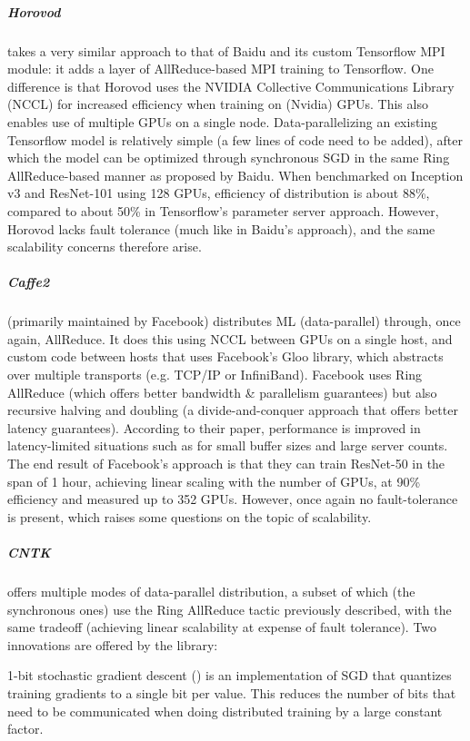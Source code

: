 \subparagraph{Horovod\citep{Horovod2018}}

takes a very similar approach to that of Baidu and its custom Tensorflow MPI module: it adds a layer of AllReduce-based MPI training to Tensorflow. One difference is that Horovod uses the NVIDIA Collective Communications Library (NCCL) for increased efficiency when training on (Nvidia) GPUs. This also enables use of multiple GPUs on a single node. Data-parallelizing an existing Tensorflow model is relatively simple (a few lines of code need to be added), after which the model can be optimized through synchronous SGD in the same Ring AllReduce-based manner as proposed by Baidu. When benchmarked on Inception v3\citep{Szegedy2015} and ResNet-101\citep{He2015} using 128 GPUs, efficiency of distribution is about 88\%, compared to about 50\% in Tensorflow's parameter server approach.
However, Horovod lacks fault tolerance (much like in Baidu's approach), and the same scalability concerns therefore arise.

\subparagraph{Caffe2}

(primarily maintained by Facebook) distributes ML (data-parallel) through, once again, AllReduce. It does this using NCCL between GPUs on a single host, and custom code between hosts that uses Facebook's Gloo library, which abstracts over multiple transports (e.g. TCP/IP or InfiniBand). Facebook uses Ring AllReduce (which offers better bandwidth \& parallelism guarantees) but also recursive halving and doubling (a divide-and-conquer approach that offers better latency guarantees). According to their paper, performance is improved in latency-limited situations such as for small buffer sizes and large server counts. The end result of Facebook’s approach is that they can train ResNet-50\citep{He2015} in the span of 1 hour\citep{Goyal2017}, achieving linear scaling with the number of GPUs, at 90\% efficiency and measured up to 352 GPUs. However, once again no fault-tolerance is present, which raises some questions on the topic of scalability.

\subparagraph{CNTK}

offers multiple modes of data-parallel distribution, a subset of which (the synchronous ones) use the Ring AllReduce tactic previously described, with the same tradeoff (achieving linear scalability at expense of fault tolerance). Two innovations are offered by the library:

1-bit stochastic gradient descent (\citet{Seide2014}) is an implementation of SGD that quantizes training gradients to a single bit per value. This reduces the number of bits that need to be communicated when doing distributed training by a large constant factor.

